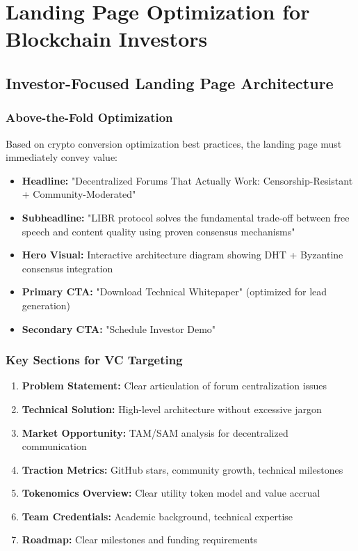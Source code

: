 \documentclass[12pt,a4paper]{article}
\begin{document}
\section{Landing Page Optimization for Blockchain Investors}

\subsection{Investor-Focused Landing Page Architecture}

\subsubsection{Above-the-Fold Optimization}
Based on crypto conversion optimization best practices, the landing page must immediately convey value:

\begin{itemize}
    \item \textbf{Headline:} "Decentralized Forums That Actually Work: Censorship-Resistant + Community-Moderated"
    \item \textbf{Subheadline:} "LIBR protocol solves the fundamental trade-off between free speech and content quality using proven consensus mechanisms"
    \item \textbf{Hero Visual:} Interactive architecture diagram showing DHT + Byzantine consensus integration
    \item \textbf{Primary CTA:} "Download Technical Whitepaper" (optimized for lead generation)
    \item \textbf{Secondary CTA:} "Schedule Investor Demo"
\end{itemize}

\subsubsection{Key Sections for VC Targeting}
\begin{enumerate}
    \item \textbf{Problem Statement:} Clear articulation of forum centralization issues
    \item \textbf{Technical Solution:} High-level architecture without excessive jargon
    \item \textbf{Market Opportunity:} TAM/SAM analysis for decentralized communication
    \item \textbf{Traction Metrics:} GitHub stars, community growth, technical milestones
    \item \textbf{Tokenomics Overview:} Clear utility token model and value accrual
    \item \textbf{Team Credentials:} Academic background, technical expertise
    \item \textbf{Roadmap:} Clear milestones and funding requirements
\end{enumerate}
\end{document}
